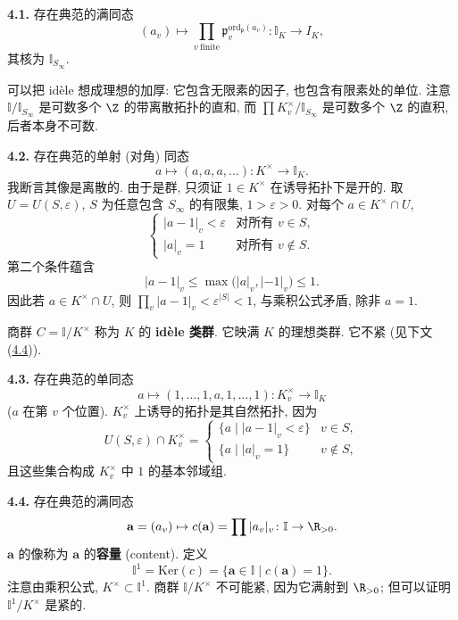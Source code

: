 \textbf{4.1.} 存在典范的满同态
\[
(a_v)\mapsto\prod_{v\ \mathrm{finite}}\mathfrak{p}_v^{\mathrm{ord}_{\mathfrak{p}}(a_v)}\colon\mathbb{I}_K\to I_K,
\]
其核为 $\mathbb{I}_{S_\infty}$.

可以把 idèle 想成理想的加厚: 它包含无限素的因子, 也包含有限素处的单位. 注意 $\mathbb{I}/\mathbb{I}_{S_\infty}$ 是可数多个 $\Z$ 的带离散拓扑的直和, 而 $\prod K_v^{\times}/\mathbb{I}_{S_\infty}$ 是可数多个 $\Z$ 的直积, 后者本身不可数.

\textbf{4.2.} 存在典范的单射 (对角) 同态
\[
a\mapsto(a,a,a,\ldots)\colon K^{\times}\to\mathbb{I}_K.
\]
我断言其像是离散的. 由于是群, 只须证 $1\in K^{\times}$ 在诱导拓扑下是开的. 取 $U=U(S,\varepsilon)$, $S$ 为任意包含 $S_\infty$ 的有限集, $1>\varepsilon>0$. 对每个 $a\in K^{\times}\cap U$,
\[
\begin{cases}
|a-1|_v<\varepsilon & \text{对所有 } v\in S,\\
|a|_v=1 & \text{对所有 } v\notin S.
\end{cases}
\]
第二个条件蕴含
\[
|a-1|_v\le\max\bigl(|a|_v,|-1|_v\bigr)\le 1.
\]
因此若 $a\in K^{\times}\cap U$, 则 $\prod_v|a-1|_v<\varepsilon^{|S|}<1$, 与乘积公式矛盾, 除非 $a=1$.

商群 $C=\mathbb{I}/K^{\times}$ 称为 $K$ 的 \textbf{idèle 类群}. 它映满 $K$ 的理想类群. 它不紧 (见下文 (\hyperlink{item:v.4.4}{4.4})).

\textbf{4.3.} 存在典范的单同态
\[
a\mapsto(1,\ldots,1,a,1,\ldots,1)\colon K_v^{\times}\to\mathbb{I}_K
\]
($a$ 在第 $v$ 个位置). $K_v^{\times}$ 上诱导的拓扑是其自然拓扑, 因为
\[
U(S,\varepsilon)\cap K_v^{\times}=
\begin{cases}
\{a\mid|a-1|_v<\varepsilon\} & v\in S,\\
\{a\mid|a|_v=1\} & v\notin S,
\end{cases}
\]
且这些集合构成 $K_v^{\times}$ 中 $1$ 的基本邻域组.

\hypertarget{item:v.4.4}{}\textbf{4.4.} 存在典范的满同态
\[
\mathbf{a}=(a_v)\mapsto c(\mathbf{a})=\prod|a_v|_v\colon\mathbb{I}\to\R_{>0}.
\]
$\mathbf{a}$ 的像称为 $\mathbf{a}$ 的\textbf{容量} (content). 定义
\[
\mathbb{I}^1=\mathrm{Ker}(c)=\{\mathbf{a}\in\mathbb{I}\mid c(\mathbf{a})=1\}.
\]
注意由乘积公式, $K^{\times}\subset\mathbb{I}^1$. 商群 $\mathbb{I}/K^{\times}$ 不可能紧, 因为它满射到 $\R_{>0}$; 但可以证明 $\mathbb{I}^1/K^{\times}$ 是紧的.

